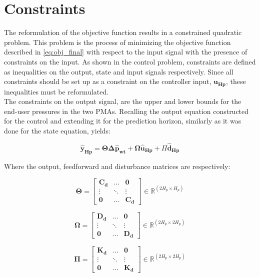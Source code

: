 
\section{Constraints}
\label{constraints_reformulation}

The reformulation of the objective function results in a constrained quadratic problem. This problem is the process of minimizing the objective function described in \eqref{eq:obj_final} with respect to the input signal with the presence of constraints on the input. As shown in the control problem, constraints are defined as inequalities on the output, state and input signals respectively. Since all constraints should be set up as a constraint on the controller input, $\bm{u_{Hp}}$, these inequalities must be reformulated. 
\\
\newline
The constraints on the output signal, are the upper and lower bounds for the end-user pressures in the two PMAs. Recalling the output equation constructed for the control and extending it for the prediction horizon, similarly as it was done for the state equation, yields: 

\begin{equation}
	\bm{\hat{y}_{Hp}} = \bm{\Theta} \bm{\Delta \hat{p}_{wt}} + \bm{\Omega} \bm{\hat{u}_{Hp}} + \Pi \bm{\hat{d}_{Hp}}
\end{equation}

Where the output, feedforward and disturbance matrices are respectively: 

\begin{equation}
  \bm{\Theta} =
 \begin{bmatrix}
 \bm{C_d} & \hdots & \bm{0} \\
 \vdots & \ddots & \vdots\\
 \bm{0} & \hdots & \bm{C_d} 
 \end{bmatrix}
 \in \pmb{\mathbb{R}}^{(2 H_p \times H_p)}
\end{equation}

\begin{equation}
   \bm{\Omega}  =
 \begin{bmatrix}
 \bm{D_d} & \hdots & \bm{0} \\
 \vdots & \ddots & \vdots\\
 \bm{0} & \hdots & \bm{D_d} 
 \end{bmatrix}
 \in \pmb{\mathbb{R}}^{(2 H_p \times 2 H_p)}
 \end{equation}
  
 \begin{equation}
 \bm{\Pi} =
 \begin{bmatrix}
 \bm{K_d} & \hdots & \bm{0} \\
 \vdots & \ddots & \vdots\\
 \bm{0} & \hdots & \bm{K_d} 
 \end{bmatrix}
 \in \pmb{\mathbb{R}}^{(2 H_p \times 2 H_p)}
 \end{equation}


